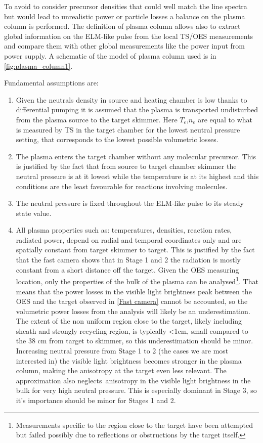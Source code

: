 To avoid to consider precursor densities that could well match the line spectra but would lead to unrealistic power or particle losses a balance on the plasma column is performed. The definition of plasma column allows also to extract global information on the ELM-like pulse from the local TS/OES measurements and compare them with other global measurements like the power input from power supply. A schematic of the model of plasma column used is in \autoref{fig:plasma_column1}.

Fundamental assumptions are:
\begin{enumerate}
    \item Given the neutrals density in source and heating chamber is low thanks to differential pumping it is assumed that the plasma is transported undisturbed from the plasma source to the target skimmer. Here $T_e$,$n_e$ are equal to what is measured by TS in the target chamber for the lowest neutral pressure setting, that corresponds to the lowest possible volumetric losses.
    \item The plasma enters the target chamber without any molecular precursor. This is justified by the fact that from source to target chamber skimmer the neutral pressure is at it lowest while the temperature is at its highest and this conditions are the least favourable for reactions involving molecules.
    \item The neutral pressure is fixed throughout the ELM-like pulse to its steady state value.
    \item All plasma properties such as: temperatures, densities, reaction rates, radiated power, depend on radial and temporal coordinates only and are spatially constant from target skimmer to target. This is justified by the fact that the fast camera shows that in Stage 1 and 2 the radiation is mostly constant from a short distance off the target. Given the OES measuring location, only the properties of the bulk of the plasma can be analysed\footnote{Measurements specific to the region close to the target have been attempted but failed possibly due to reflections or obstructions by the target itself.}. That means that the power losses in the visible light brightness peak between the OES and the target observed in \autoref{Fast camera} cannot be accounted, so the volumetric power losses from the analysis will likely be an underestimation. The extent of the non uniform region close to the target, likely including sheath and strongly recycling region, is typically <1cm, small compared to the 38 cm from target to skimmer, so this underestimation should be minor. Increasing neutral pressure from Stage 1 to 2 (the cases we are most interested in) the visible light brightness becomes stronger in the plasma column, making the anisotropy at the target even less relevant. The approximation also neglects\ anisotropy in the visible light brightness in the bulk for very high neutral pressure. This is especially dominant in Stage 3, so it's importance should be minor for Stages 1 and 2.

\end{enumerate}

